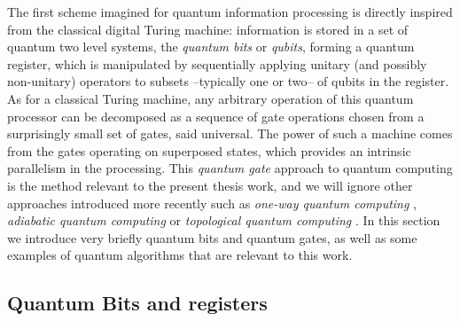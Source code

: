 The first scheme imagined for quantum information processing is directly inspired from the classical digital Turing machine: information is stored in a set of quantum two level systems, the {\it quantum bits} or {\it qubits}, forming a quantum register, which is manipulated by sequentially applying unitary (and possibly non-unitary) operators to subsets --typically one or two-- of qubits in the register. As for a classical Turing machine, any arbitrary operation of this quantum processor can be decomposed as a sequence of gate operations chosen from a surprisingly small set of gates, said universal. The power of such a machine comes from the gates operating on superposed states, which provides an intrinsic parallelism in the processing.
\smallskip
This {\it quantum gate} approach to quantum computing is the method relevant to the present thesis work, and we will ignore other approaches introduced more recently such as {\it one-way quantum computing} \citep{raussendorf_one-way_2001}, {\it adiabatic quantum computing} \citep{farhi_quantum_2000} or {\it topological quantum computing} \citep{kitaev_fault-tolerant_2003}. In this section we introduce very briefly quantum bits and quantum gates, as well as some examples of quantum algorithms that are relevant to this work.


\subsection{Quantum Bits and registers}

